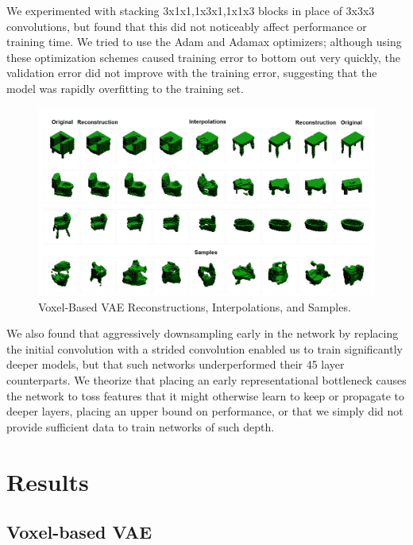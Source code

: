 \documentclass{article}
\begin{document}
We experimented with stacking 3x1x1,1x3x1,1x1x3 blocks in place of 3x3x3 convolutions, but found that this did not noticeably affect performance or training time. We tried to use the Adam and Adamax\citep{Adam} optimizers; although using these optimization schemes caused training error to bottom out very quickly, the validation error did not improve with the training error, suggesting that the model was rapidly overfitting to the training set.
 
\begin{figure}[h]
  	
  \centering
  \includegraphics[scale=.25]{interpolations.png}
  \caption{Voxel-Based VAE Reconstructions, Interpolations, and Samples.}
  \label{VAERECONfig}
\end{figure}

We also found that aggressively downsampling early in the network by replacing the initial convolution with a strided convolution enabled us to train significantly deeper models, but that such networks underperformed their 45 layer counterparts. We theorize that placing an early representational bottleneck causes the network to toss features that it might otherwise learn to keep or propagate to deeper layers, placing an upper bound on performance, or that we simply did not provide sufficient data to train networks of such depth.


\section{Results}
\label{RESULTS}

\subsection{Voxel-based VAE}
\end{document}
